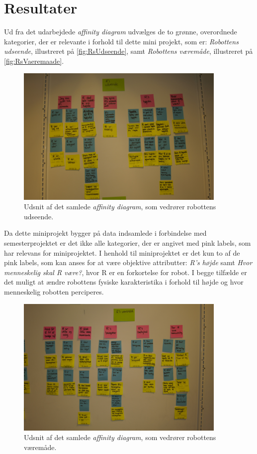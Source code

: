 \section*{Resultater}
\label{Resultater}
%
Ud fra det udarbejdede \textit{affinity diagram} udvælges de to grønne, overordnede kategorier, der er relevante i forhold til dette mini projekt, som er: \textit{Robottens udseende}, illustreret på \autoref{fig:RsUdseende}, samt \textit{Robottens væremåde}, illustreret på \autoref{fig:RsVaeremaade}.
%
\begin{figure}[H]
\centering
\includegraphics[width = 0.9\textwidth]{Figure/RsUdseende} 
\caption{Udsnit af det samlede \textit{affinity diagram}, som vedrører robottens udseende.}
\label{fig:RsUdseende}
\end{figure}
\noindent
%
Da dette miniprojekt bygger på data indsamlede i forbindelse med semesterprojektet er det ikke alle kategorier, der er angivet med pink labels, som har relevans for miniprojektet. I henhold til miniprojektet er det kun to af de pink labels, som kan anses for at være objektive attributter: \textit{R's højde} samt \textit{Hvor menneskelig skal R være?}, hvor R er en forkortelse for robot. I begge tilfælde er det muligt at ændre robottens fysiske karakteristika i forhold til højde og hvor menneskelig robotten perciperes. 
%
\begin{figure}[H]
\centering
\includegraphics[width = 0.9\textwidth]{Figure/RsVaeremaade} 
\caption{Udsnit af det samlede \textit{affinity diagram}, som vedrører robottens væremåde.}
\label{fig:RsVaeremaade}
\end{figure}
